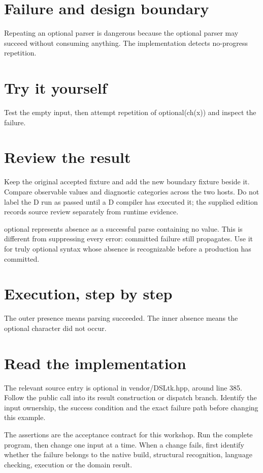 
\section*{Failure and design boundary}
Repeating an optional parser is dangerous because the optional parser may succeed without consuming anything. The implementation detects no-progress repetition.

\section*{Try it yourself}
Test the empty input, then attempt repetition of optional(ch(x)) and inspect the failure.

\section*{Review the result}
Keep the original accepted fixture and add the new boundary fixture beside it. Compare observable values and diagnostic categories across the two hosts. Do not label the D run as passed until a D compiler has executed it; the supplied edition records source review separately from runtime evidence.

\clearpage
{}
optional represents absence as a successful parse containing no value. This is different from suppressing every error: committed failure still propagates. Use it for truly optional syntax whose absence is recognizable before a production has committed.


\section*{Execution, step by step}
The outer presence means parsing succeeded. The inner absence means the optional character did not occur.

\section*{Read the implementation}
The relevant source entry is optional in vendor/DSLtk.hpp, around line 385. Follow the public call into its result construction or dispatch branch. Identify the input ownership, the success condition and the exact failure path before changing this example.

The assertions are the acceptance contract for this workshop. Run the complete program, then change one input at a time. When a change fails, first identify whether the failure belongs to the native build, structural recognition, language checking, execution or the domain result.


